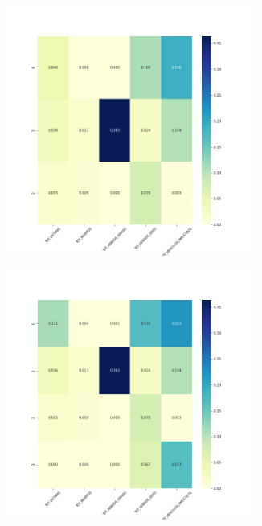 \begin{figure}[H]
\begin{subfigure}{.5\textwidth}
  \centering
  \includegraphics[width=0.9\textwidth]{imagenes/case2/agglomerative/heatmaps/hm_agglomerative_case2_entrada_k3.png}
\end{subfigure}%
\begin{subfigure}{.5\textwidth}
  \centering
  \includegraphics[width=0.9\textwidth]{imagenes/case2/agglomerative/heatmaps/hm_agglomerative_case2_entrada_k4.png}

\end{subfigure}
\end{figure}
